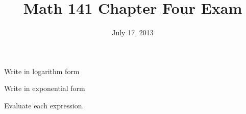 \documentclass[fleqn,addpoints]{exam}
\title{Math 141 Chapter Four Exam}
\date{July 17, 2013}
\author{}
\begin{document}
  \maketitle  


  \begin{center}
  \gradetable[h][pages]
  \bonusgradetable[h][pages]
  \end{center}

  \begin{questions}

    \question Write in logarithm form

    \question Write in exponential form

    \question Evaluate each expression.
\end{questions}
\end{document}
